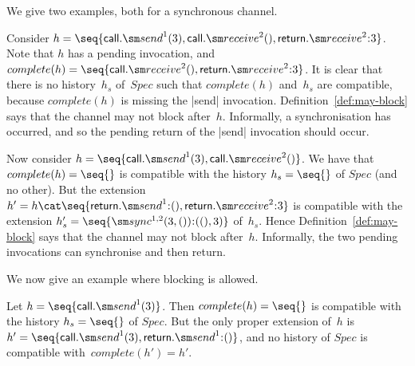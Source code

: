 
We give two examples, both for a synchronous channel.
%
\begin{example}
Consider $h = \seq{ \call.\send^1(3), \call.\receive^2(),
  \return.\receive^2\::3 }$.  Note that $h$ has a pending invocation, and
$complete(h) = \seq{\call.\receive^2(),\linebreak[1] \return.\receive^2\::3}$.
It is clear that there is no history~$h_s$ of~$Spec$ such that $complete(h)$
and~$h_s$ are compatible, because $complete(h)$ is missing the |send| invocation.
%
Definition~\ref{def:may-block} says that the channel may not block after~$h$.
Informally, a synchronisation has occurred, and so the pending return of the
|send| invocation should occur.
\end{example}

\begin{example}
Now consider $h = \seq{\call.\send^1(3), \call.\receive^2()}$.  We have that
$complete(h) = \seq{}$ is compatible with the history $h_s = \seq{}$ of $Spec$
(and no other). But the extension $h' = h \cat
\seq{\return.\send^1\::(),\linebreak[1] \return.\receive^2\::3}$ is compatible
with the extension $h_s' = \linebreak[1] \seq{\sync^{1,2}(3,()) \:: ((),3)}$
of~$h_s$.  Hence Definition~\ref{def:may-block} says that the channel may not
block after~$h$.  Informally, the two pending invocations can synchronise and
then return.
\end{example}

We now give an example where blocking is allowed.
%
\begin{example}  
Let $h = \seq{\call.\send^1(3)}$.  Then $complete(h) = \seq{}$ is compatible
with the history $h_s = \seq{}$ of $Spec$.  But the only proper extension
of~$h$ is $h' = \seq{\call.\send^1(3),\linebreak[1] \return.\send^1\::()}$,
and no history of $Spec$ is compatible with~$complete(h') = h'$.
\end{example}



